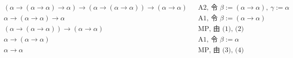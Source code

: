 \begin{solution}
  \begin{align}
    &(\alpha \to (\alpha \to \alpha) \to \alpha) \to
      (\alpha \to (\alpha \to \alpha)) \to (\alpha \to \alpha)
      && \text{A2, 令 $\beta := (\alpha \to \alpha),\ \gamma := \alpha$} \tag{1} \\
    &\alpha \to (\alpha \to \alpha) \to \alpha
      && \text{A1, 令 $\beta := (\alpha \to \alpha)$} \tag{2} \\
    &(\alpha \to (\alpha \to \alpha)) \to (\alpha \to \alpha)
      && \text{MP, 由 (1), (2)} \tag{3} \\
    &\alpha \to (\alpha \to \alpha)
      && \text{A1, 令 $\beta := \alpha$} \tag{4} \\
    &\alpha \to \alpha
      && \text{MP, 由 (3), (4)} \tag{5}
  \end{align}
\end{solution}